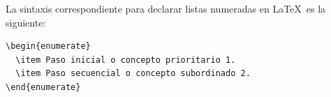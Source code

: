 \documentclass[11pt, a4paper]{article}
\begin{document}
La sintaxis correspondiente para declarar listas numeradas en \LaTeX\ es la siguiente:

\begin{lstlisting}[caption={Código para listas numeradas secuenciales}]
\begin{enumerate}
  \item Paso inicial o concepto prioritario 1.
  \item Paso secuencial o concepto subordinado 2.
\end{enumerate} 
\end{lstlisting}
\end{document}
